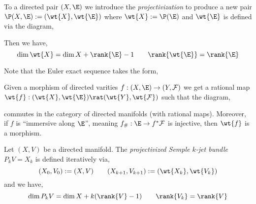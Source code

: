 \documentclass[12pt]{article}
\renewcommand{\F}{\mathcal{F}}
\newcommand{\cO}{\mathcal{O}}
\begin{document}
\begin{defn}
To a directed pair $(X, \E)$ we introduce the \textit{projectivization} to produce a new pair $\P(X, \E) := (\wt{X}, \wt{\E})$ where $\wt{X} := \P(\E)$ and $\wt{\E}$ is defined via the diagram,
\begin{center}
\end{center}
Then we have,
\[ \dim{\wt{X}} = \dim{X} + \rank{\E} - 1 \quad \quad \rank{\wt{\E}} = \rank{\E} \] 
\end{defn}

\begin{rmk}
Note that the Euler exact sequence takes the form,
\begin{center}
\end{center}
\end{rmk}

\begin{prop}
Given a morphism of directed varities $f : (X, \E) \to (Y, \F)$ we get a rational map $\wt{f} : (\wt{X}, \wt{\E}) \rat (\wt{Y}, \wt{\F})$ such that the diagram,
\begin{center}
\end{center} 
commutes in the category of directed manifolds (with rational maps). Moreover, if $f$ is ``immersive along $\E$'', meaning $f_{\#} : \E \to f^* \F$ is injective, then $\wt{f}$ is a morphism.
\end{prop}

\begin{defn}
Let $(X, V)$ be a directed manifold. The \textit{projectivized Semple $k$-jet bundle} $P_k V = X_k$ is defined iteratively via,
\[ (X_0, V_0) := (X, V) \quad \quad (X_{k+1}, V_{k+1}) := (\wt{X_k}, \wt{V_k}) \]
and we have,
\[ \dim{P_k V} = \dim{X} + k (\rank{V} - 1) \quad \quad \rank{V_k} = \rank{V} \]
\end{defn}
\end{document}
